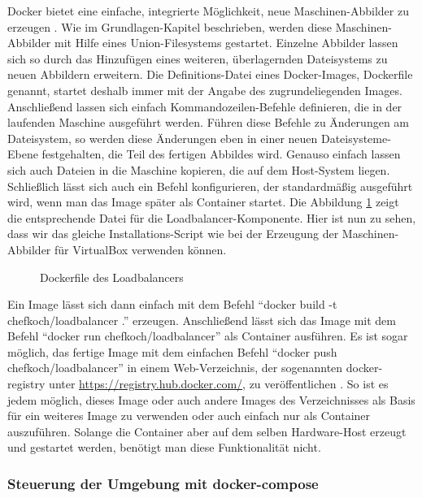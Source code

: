 Docker bietet eine einfache, integrierte Möglichkeit, neue Maschinen-Abbilder zu erzeugen \citep[Vgl.][]{docker:003}. Wie im Grundlagen-Kapitel beschrieben, werden diese Maschinen-Abbilder mit Hilfe eines Union-Filesystems gestartet. Einzelne Abbilder lassen sich so durch das Hinzufügen eines weiteren, überlagernden Dateisystems zu neuen Abbildern erweitern. Die Definitions-Datei eines Docker-Images, Dockerfile genannt, startet deshalb immer mit der Angabe des zugrundeliegenden Images. Anschließend lassen sich einfach Kommandozeilen-Befehle definieren, die in der laufenden Maschine ausgeführt werden. Führen diese Befehle zu Änderungen am Dateisystem, so werden diese Änderungen eben in einer neuen Dateisysteme-Ebene festgehalten, die Teil des fertigen Abbildes wird. Genauso einfach lassen sich auch Dateien in die Maschine kopieren, die auf dem Host-System liegen. Schließlich lässt sich auch ein Befehl konfigurieren, der standardmäßig ausgeführt wird, wenn man das Image später als Container startet. Die Abbildung \ref{loadbalancer-dockerfile} zeigt die entsprechende Datei für die Loadbalancer-Komponente. Hier ist nun zu sehen, dass wir das gleiche Installations-Script wie bei der Erzeugung der Maschinen-Abbilder für VirtualBox verwenden können.

\begin{figure}[!ht]
  \begin{center}
    \caption{Dockerfile des Loadbalancers}
    \label{loadbalancer-dockerfile}
  \end{center}
\end{figure}

Ein Image lässt sich dann einfach mit dem Befehl "`docker build -t chefkoch/loadbalancer ."' erzeugen. Anschließend lässt sich das Image mit dem Befehl "`docker run chefkoch/loadbalancer"' als Container ausführen. Es ist sogar möglich, das fertige Image mit dem einfachen Befehl "`docker push chefkoch/loadbalancer"' in einem Web-Verzeichnis, der sogenannten docker-registry unter \href{https://registry.hub.docker.com/}{https://registry.hub.docker.com/}, zu veröffentlichen \citep[Vgl][]{docker:004}. So ist es jedem möglich, dieses Image oder auch andere Images des Verzeichnisses als Basis für ein weiteres Image zu verwenden oder auch einfach nur als Container auszuführen. Solange die Container aber auf dem selben Hardware-Host erzeugt und gestartet werden, benötigt man diese Funktionalität nicht.

\subsubsection{Steuerung der Umgebung mit docker-compose}

